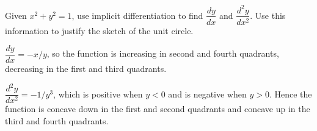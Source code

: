 {Given $x^2+y^2=1$, use implicit differentiation to find $\dfrac{dy}{dx}$ and $\dfrac{d^2y}{dx^2}$. Use this information to justify the sketch of the unit circle.
}
{$\dfrac{dy}{dx} = -x/y$, so the function is increasing in second and fourth quadrants, decreasing in the first and third quadrants.

$\dfrac{d^2y}{dx^2} = -1/y^3$, which is positive when $y<0$ and is negative when $y>0$. Hence the function is concave down in the first and second quadrants and concave up in the third and fourth quadrants.
}
